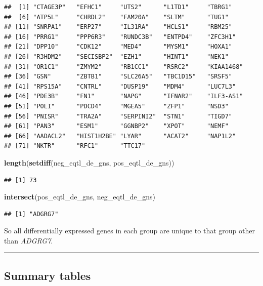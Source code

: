 \documentclass[]{article}
\newenvironment{Shaded}{\begin{snugshade}}{\end{snugshade}}
\newcommand{\KeywordTok}[1]{\textcolor[rgb]{0.13,0.29,0.53}{\textbf{#1}}}
\newcommand{\NormalTok}[1]{#1}
\begin{document}
\begin{verbatim}
##  [1] "CTAGE3P"   "EFHC1"     "UTS2"      "L1TD1"     "TBRG1"    
##  [6] "ATP5L"     "CHRDL2"    "FAM20A"    "SLTM"      "TUG1"     
## [11] "SNRPA1"    "ERP27"     "IL31RA"    "HCLS1"     "RBM25"    
## [16] "PRRG1"     "PPP6R3"    "RUNDC3B"   "ENTPD4"    "ZFC3H1"   
## [21] "DPP10"     "CDK12"     "MED4"      "MYSM1"     "HOXA1"    
## [26] "R3HDM2"    "SECISBP2"  "EZH1"      "HINT1"     "NEK1"     
## [31] "OR1C1"     "ZMYM2"     "RB1CC1"    "RSRC2"     "KIAA1468" 
## [36] "GSN"       "ZBTB1"     "SLC26A5"   "TBC1D15"   "SRSF5"    
## [41] "RPS15A"    "CNTRL"     "DUSP19"    "MDM4"      "LUC7L3"   
## [46] "PDE3B"     "FN1"       "NAPG"      "IFNAR2"    "ILF3-AS1" 
## [51] "POLI"      "PDCD4"     "MGEA5"     "ZFP1"      "NSD3"     
## [56] "PNISR"     "TRA2A"     "SERPINI2"  "STN1"      "TIGD7"    
## [61] "PAN3"      "ESM1"      "GGNBP2"    "XPOT"      "NEMF"     
## [66] "AADACL2"   "HIST1H2BE" "LYAR"      "ACAT2"     "NAP1L2"   
## [71] "NKTR"      "RFC1"      "TTC17"
\end{verbatim}

\begin{Shaded}
\begin{Highlighting}[]
\KeywordTok{length}\NormalTok{(}\KeywordTok{setdiff}\NormalTok{(neg_eqtl_de_gns, pos_eqtl_de_gns))}
\end{Highlighting}
\end{Shaded}

\begin{verbatim}
## [1] 73
\end{verbatim}

\begin{Shaded}
\begin{Highlighting}[]
\KeywordTok{intersect}\NormalTok{(pos_eqtl_de_gns, neg_eqtl_de_gns)}
\end{Highlighting}
\end{Shaded}

\begin{verbatim}
## [1] "ADGRG7"
\end{verbatim}

So all differentially expressed genes in each group are unique to that
group other than \emph{ADGRG7}.

\begin{center}\rule{0.5\linewidth}{\linethickness}\end{center}

\subsection{Summary tables}\label{summary-tables}
\end{document}
